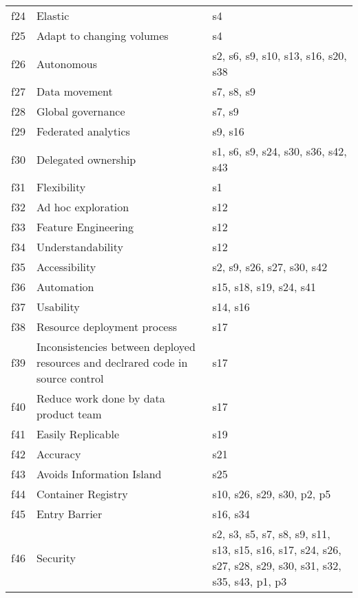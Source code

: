 \begin{tabular}{|c|p{}|p{}|}
f24 & Elastic & \cellcolor{emerald_shape_1} {s4}\\
f25 & Adapt to changing volumes & \cellcolor{emerald_shape_1} {s4}\\
f26 & Autonomous & \cellcolor{emerald_shape_3} {s2, s6, s9, s10, s13, s16, s20, s38}\\
f27 & Data movement & \cellcolor{emerald_shape_2} {s7, s8, s9}\\
f28 & Global governance & \cellcolor{emerald_shape_1} {s7, s9}\\
f29 & Federated analytics & \cellcolor{emerald_shape_1} {s9, s16}\\
f30 & Delegated ownership & \cellcolor{emerald_shape_3} {s1, s6, s9, s24, s30, s36, s42, s43}\\
f31 & Flexibility & \cellcolor{emerald_shape_1} {s1}\\
f32 & Ad hoc exploration & \cellcolor{emerald_shape_1} {s12}\\
f33 & Feature Engineering & \cellcolor{emerald_shape_1} {s12}\\
f34 & Understandability & \cellcolor{emerald_shape_1} {s12}\\
f35 & Accessibility & \cellcolor{emerald_shape_3} {s2, s9, s26, s27, s30, s42}\\
f36 & Automation & \cellcolor{emerald_shape_3} {s15, s18, s19, s24, s41}\\
f37 & Usability & \cellcolor{emerald_shape_1} {s14, s16}\\
f38 & Resource deployment process & \cellcolor{emerald_shape_1} {s17}\\
f39 & Inconsistencies between deployed resources and declrared code in source control & \cellcolor{emerald_shape_1} {s17}\\
f40 & Reduce work done by data product team & \cellcolor{emerald_shape_1} {s17}\\
f41 & Easily Replicable & \cellcolor{emerald_shape_1} {s19}\\
f42 & Accuracy & \cellcolor{emerald_shape_1} {s21}\\
f43 & Avoids Information Island & \cellcolor{emerald_shape_1} {s25}\\
f44 & Container Registry & \cellcolor{emerald_shape_3} {s10, s26, s29, s30, p2, p5}\\
f45 & Entry Barrier & \cellcolor{emerald_shape_1} {s16, s34}\\
f46 & Security & \cellcolor{emerald_shape_6} {s2, s3, s5, s7, s8, s9, s11, s13, s15, s16, s17, s24, s26, s27, s28, s29, s30, s31, s32, s35, s43, p1, p3}\\
\hline
\end{tabular}
